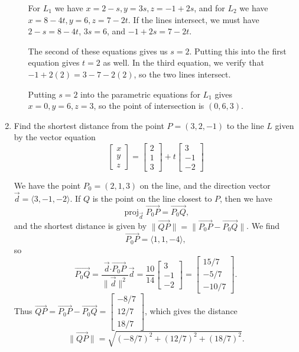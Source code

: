 \documentclass[12pt]{article}
\newcommand{\points}[1]{\marginpar{\hspace{24pt}[#1]}}
\newcommand{\dotp}{\boldsymbol{\cdot}}
\newcommand{\len}[1]{\lVert #1\rVert}
\DeclareMathOperator{\proj}{proj}
\begin{document}
\begin{enumerate}
\begin{enumerate}
\bigskip

For $L_1$ we have $x=2-s, y=3s, z=-1+2s$, and for $L_2$ we have $x=8-4t, y=6, z=7-2t$. If the lines intersect, we must have $2-s = 8-4t$, $3s=6$, and $-1+2s=7-2t$.

The second of these equations gives us $s=2$. Putting this into the first equation gives $t=2$ as well. In the third equation, we verify that $-1+2(2)=3-7-2(2)$, so the two lines intersect.

Putting $s=2$ into the parametric equations for $L_1$ gives $x=0, y=6, z=3$, so the point of intersection is $(0,6,3)$.
      \end{enumerate}




\newpage
\item Find the shortest distance from the point $P=(3,2,-1)$ to the line $L$ given by the vector equation \points{5}
\[
\begin{bmatrix}x\\y\\z\end{bmatrix} = \begin{bmatrix}2\\1\\3\end{bmatrix} + t\begin{bmatrix}3\\-1\\-2\end{bmatrix}
\]

\bigskip

We have the point $P_0=(2,1,3)$ on the line, and the direction vector $\vec{d}=\langle 3,-1,-2\rangle$. If $Q$ is the point on the line closest to $P$, then we have
\[
 \proj_{\vec{d}}\overrightarrow{P_0P}=\overrightarrow{P_0Q},
\]
and the shortest distance is given by $\len{\overrightarrow{QP}}=\len{\overrightarrow{P_0P}-\overrightarrow{P_0Q}}$. We find
\[
 \overrightarrow{P_0P} = \langle 1,1,-4\rangle,
\]
so
\[
 \overrightarrow{P_0Q} = \frac{\vec{d}\dotp\overrightarrow{P_0P}}{\len{\vec{d}}^2}\vec{d} = \frac{10}{14}\begin{bmatrix}3\\-1\\-2\end{bmatrix}=\begin{bmatrix}15/7\\-5/7\\-10/7\end{bmatrix}.
\]
Thus $\overrightarrow{QP} = \overrightarrow{P_0P}-\overrightarrow{P_0Q} = \begin{bmatrix}-8/7\\12/7\\18/7\end{bmatrix}$, which gives the distance
\[
 \len{\overrightarrow{QP}} = \sqrt{(-8/7)^2+(12/7)^2+(18/7)^2}.
\]



\end{enumerate}
\end{document}
